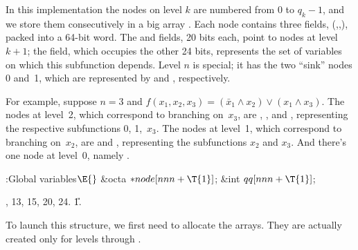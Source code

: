 In this implementation the nodes on level $k$ are numbered from 0 to
$q_k-1$, and we store them consecutively in a big array .
Each node contains three fields, (,,), packed
into a
64-bit word. The  and  fields, 20 bits each, point to
nodes
at level~$k+1$; the  field, which occupies the other 24 bits,
represents the set of variables on which this subfunction depends.
Level $n$ is special; it has the two ``sink'' nodes 0 and~1,
which are represented by  and , respectively.

For example, suppose $n=3$ and $f(x_1,x_2,x_3)=(\bar x_1\land x_2)
\lor(x_1\land x_3)$. The nodes at level~2, which correspond to
branching on~$x_3$, are
,
, and
, representing the
respective subfunctions 0, 1,~$x_3$.
The nodes at level~1, which correspond to branching on~$x_2$, are
 and
, representing the
subfunctions $x_2$ and $x_3$.
And there's one node at level~0, namely
.

\Y\B\4:Global variables\X${}\E{}$\6
\&{octa} ${}{*}\\{node}[\\{nnn}+\T{1}]{}$;\6
\&{int} ${}\\{qq}[\\{nnn}+\T{1}]{}$;\par
{}, 13, 15, 20, 24.
\U1.\fi

To launch this structure, we first need to allocate the 
arrays.
They are actually created only for levels  through .

